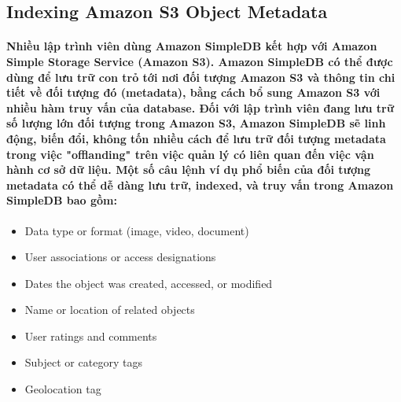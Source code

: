 	\subsection{Indexing Amazon S3 Object Metadata}
		\paragraph{Nhiều lập trình viên dùng Amazon SimpleDB kết hợp với Amazon Simple Storage Service (Amazon S3). Amazon SimpleDB có thể được dùng để lưu trữ con trỏ tới nơi đối tượng Amazon S3 và thông tin chi tiết về đối tượng đó (metadata), bằng cách bổ sung Amazon S3 với nhiều hàm truy vấn của database. Đối với lập trình viên đang lưu trữ số lượng lớn đối tượng trong Amazon S3, Amazon SimpleDB sẽ linh động, biến đổi, không tốn nhiều cách để lưu trữ đối tượng metadata trong việc "offlanding" trên việc quản lý có liên quan đến việc vận hành cơ sở dữ liệu. Một số câu lệnh ví dụ phổ biến của đối tượng metadata có thể dễ dàng lưu trữ, indexed, và truy vấn trong Amazon SimpleDB bao gồm:  }
		\begin{itemize}
			\item Data type or format (image, video, document)
			\item User associations or access designations
			\item Dates the object was created, accessed, or modified
			\item Name or location of related objects
			\item User ratings and comments
			\item Subject or category tags
			\item Geolocation tag
		\end{itemize}
